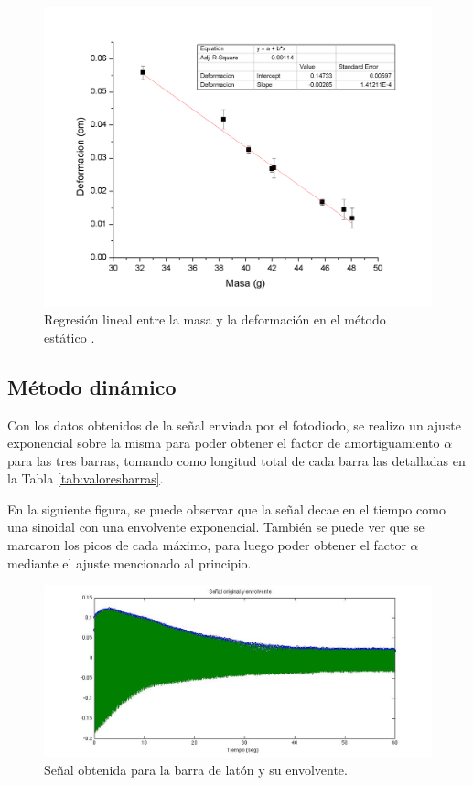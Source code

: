 \documentclass[twoside,twocolumn,a4paper]{article}
\begin{document}
\begin{figure}[H]
\includegraphics[width=\linewidth]{regrlin.png}
\caption{Regresi\'on lineal entre la masa y la deformaci\'on en el m\'etodo est\'atico .}
\label{fig:regrlin}
\end{figure}


\subsection{M\'etodo din\'amico}

Con los datos obtenidos de la se\~nal enviada por el fotodiodo, se realizo un ajuste exponencial sobre la misma para poder obtener el factor de amortiguamiento $\alpha$ para las tres barras, tomando como longitud total de cada barra las detalladas en la Tabla \ref{tab:valoresbarras}. \newline

En la siguiente figura, se puede observar que la se\~nal decae en el tiempo como una sinoidal con una envolvente exponencial. Tambi\'en se puede ver que se marcaron los picos de cada m\'aximo, para luego poder obtener el factor $\alpha$ mediante el ajuste mencionado al principio.

\begin{figure}[H]
\includegraphics[width=\linewidth]{senalenvolvente.jpg}
\caption{Se\~nal obtenida para la barra de lat\'on y su envolvente.}
\label{fig:senalenvolvente}
\end{figure}
\end{document}
